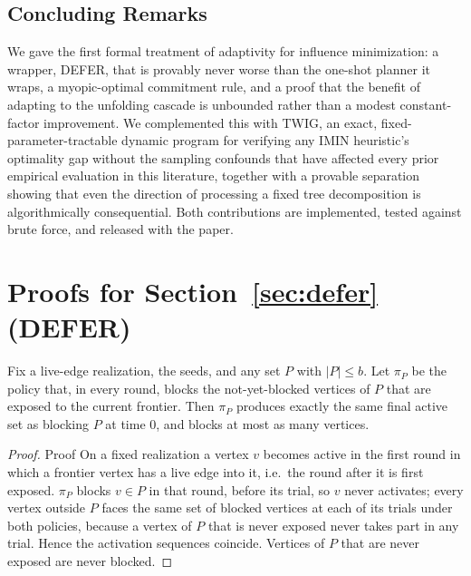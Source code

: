 \documentclass[ijoc,sglanonrev]{informs4}
\begin{document}
\subsection{Concluding Remarks}\label{sec:conclusion}

We gave the first formal treatment of adaptivity for influence
minimization: a wrapper, DEFER, that is provably never worse than the
one-shot planner it wraps, a myopic-optimal commitment rule, and a proof
that the benefit of adapting to the unfolding cascade is unbounded rather
than a modest constant-factor improvement. We complemented this with TWIG,
an exact, fixed-parameter-tractable dynamic program for verifying any IMIN
heuristic's optimality gap without the sampling confounds that have affected
every prior empirical evaluation in this literature, together with a
provable separation showing that even the direction of processing a fixed
tree decomposition is algorithmically consequential. Both contributions are
implemented, tested against brute force, and released with the paper.



\ECSwitch
\ECDisclaimer
{}

\section{Proofs for Section~\ref{sec:defer} (DEFER)}\label{ec:defer-proofs}

\begin{repeatlemma}
Fix a live-edge realization, the seeds, and any set $P$ with $|P|\le b$. Let
$\pi_P$ be the policy that, in every round, blocks the not-yet-blocked
vertices of $P$ that are exposed to the current frontier. Then $\pi_P$
produces exactly the same final active set as blocking $P$ at time $0$, and
blocks at most as many vertices.
\end{repeatlemma}
\begin{proof}{Proof}
On a fixed realization a vertex $v$ becomes active in the first round in
which a frontier vertex has a live edge into it, i.e.\ the round after it is
first exposed. $\pi_P$ blocks $v\in P$ in that round, before its trial, so
$v$ never activates; every vertex outside $P$ faces the same set of blocked
vertices at each of its trials under both policies, because a vertex of $P$
that is never exposed never takes part in any trial. Hence the activation
sequences coincide. Vertices of $P$ that are never exposed are never
blocked.\Halmos
\end{proof}
\end{document}
